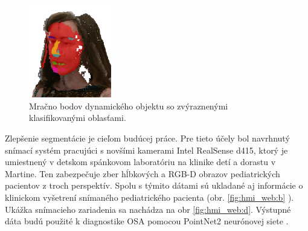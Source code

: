 \begin{figure}[H]
	\centering
	\includegraphics[width=0.32\textwidth]{figures/rcnn_cloud2.png}
	\caption{Mračno bodov dynamického objektu so zvýraznenými klasifikovanými oblasťami.}
	\label{fig:rcnn:cloud}
\end{figure}

Zlepšenie segmentácie je cieľom budúcej práce. Pre tieto účely bol navrhnutý snímací systém pracujúci s novšími kamerami Intel RealSense d415, ktorý je umiestnený v detskom spánkovom laboratóriu na klinike detí a dorastu v Martine. Ten zabezpečuje zber hĺbkových a RGB-D obrazov pediatrických pacientov z troch perspektív. Spolu s týmito dátami sú ukladané aj informácie o klinickom vyšetrení snímaného pediatrického pacienta (obr. \ref{fig:hmi_web:b} ). Ukážka snímacieho zariadenia sa nachádza na obr \ref{fig:hmi_web:d}. Výstupné dáta budú použité k diagnostike OSA pomocou PointNet2 neurónovej siete \cite{qi2017pointnetplusplus}.

%


